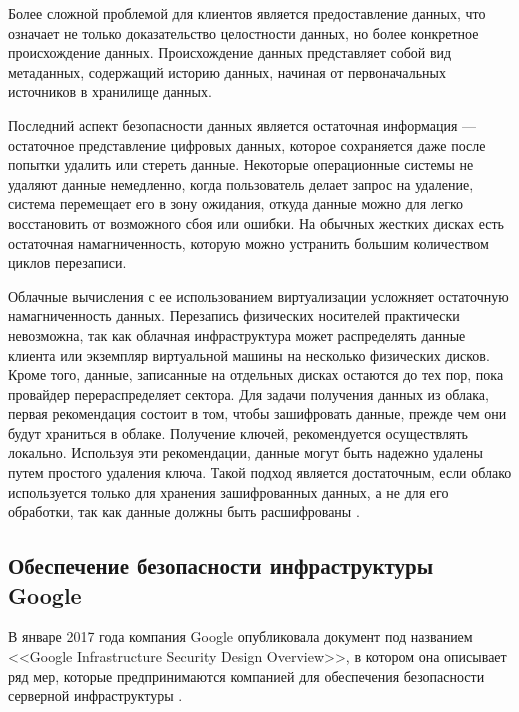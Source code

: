 Более сложной проблемой для клиентов является предоставление данных, что означает не только доказательство целостности данных, но более конкретное происхождение данных.
Происхождение данных представляет собой вид метаданных, содержащий историю данных, начиная от первоначальных источников в хранилище данных.

Последний аспект безопасности данных является остаточная информация --- остаточное представление цифровых данных, которое сохраняется даже после попытки удалить или стереть данные.
Некоторые операционные системы не удаляют данные немедленно, когда пользователь делает запрос на удаление, система перемещает его в зону ожидания, откуда данные можно для легко восстановить от возможного сбоя или ошибки.
На обычных жестких дисках есть остаточная намагниченность, которую можно устранить большим количеством циклов перезаписи.

Облачные вычисления с ее использованием виртуализации усложняет остаточную намагниченность данных.
Перезапись физических носителей практически невозможна, так как облачная инфраструктура может распределять данные клиента или экземпляр виртуальной машины на несколько физических дисков.
Кроме того, данные, записанные на отдельных дисках остаются до тех пор, пока провайдер перераспределяет сектора.
Для задачи получения данных из облака, первая рекомендация состоит в том, чтобы зашифровать данные, прежде чем они будут храниться в облаке.
Получение ключей, рекомендуется осуществлять локально.
Используя эти рекомендации, данные могут быть надежно удалены путем простого удаления ключа.
Такой подход является достаточным, если облако используется только для хранения зашифрованных данных, а не для его обработки, так как данные должны быть расшифрованы \cite{zap}.

\subsection{Обеспечение безопасности инфраструктуры Google}

В январе 2017 года компания Google опубликовала документ под названием <<Google Infrastructure Security Design Overview>>, в котором она описывает ряд мер, которые предпринимаются компанией для обеспечения безопасности серверной инфраструктуры \cite{google}.

